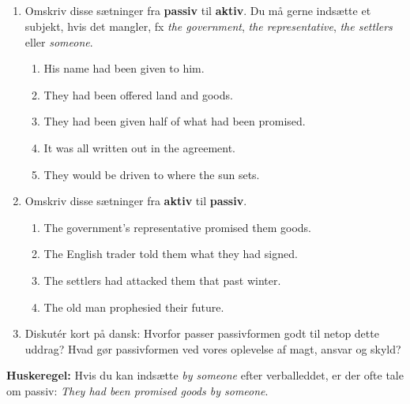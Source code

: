 \documentclass[10pt,a4paper,table]{article}
\begin{document}
\subsection{}

\begin{enumerate}[label=\arabic*., leftmargin=*]
  \item Omskriv disse sætninger fra \textbf{passiv} til \textbf{aktiv}. Du må gerne indsætte et subjekt, hvis det mangler, fx \textit{the government}, \textit{the representative}, \textit{the settlers} eller \textit{someone}.
  \begin{enumerate}[label=\textbf{\alph*.}, leftmargin=1.5em]
    \item His name had been given to him.
    \item They had been offered land and goods.
    \item They had been given half of what had been promised.
    \item It was all written out in the agreement.
    \item They would be driven to where the sun sets.
  \end{enumerate}

  \item Omskriv disse sætninger fra \textbf{aktiv} til \textbf{passiv}.
  \begin{enumerate}[label=\textbf{\alph*.}, leftmargin=1.5em]
    \item The government's representative promised them goods.
    \item The English trader told them what they had signed.
    \item The settlers had attacked them that past winter.
    \item The old man prophesied their future.
  \end{enumerate}

  \item Diskutér kort på dansk: Hvorfor passer passivformen godt til netop dette uddrag? Hvad gør passivformen ved vores oplevelse af magt, ansvar og skyld?
\end{enumerate}

\vspace{1cm}
\textbf{Huskeregel:} Hvis du kan indsætte \textit{by someone} efter verballeddet, er der ofte tale om passiv: \textit{They had been promised goods by someone}.
\end{document}
